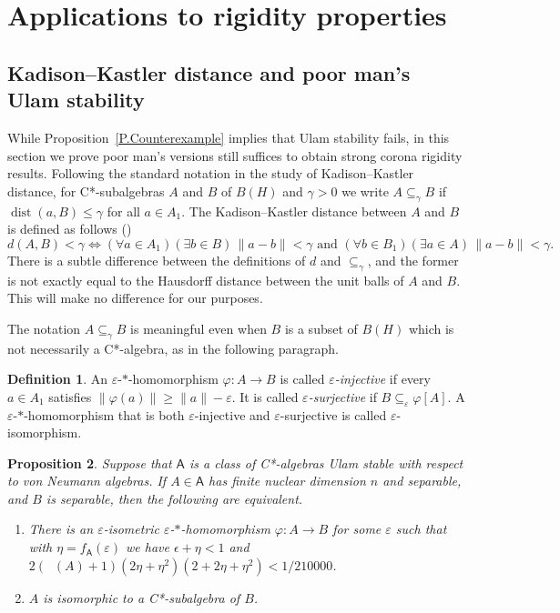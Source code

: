 \documentclass[11pt]{amsproc}
\DeclareMathOperator{\dist}{dist}
\DeclareMathOperator{\dimnuc}{dim_{nuc}}
\newcommand{\cstar}{C*}
\newcommand{\sfA}{\mathsf A}
\theoremstyle{definition}
\newtheorem{definition}{Definition}[section]
\theoremstyle{plain}
\newtheorem{proposition}[definition]{Proposition}
\theoremstyle{remark}
\begin{document}
\section{Applications to rigidity properties}

\subsection{Kadison--Kastler distance and poor man's Ulam stability}\label{S.KadisonKastler}


While Proposition~\ref{P.Counterexample} implies that Ulam stability fails, in this section we prove poor man's versions  still suffices to obtain strong corona rigidity results. Following the standard notation in the study of Kadison--Kastler distance, for \cstar-subalgebras $A$ and $B$ of $B(H)$ and $\gamma>0$ we write $A\subseteq_\gamma B$ if $\dist(a,B)\leq \gamma$ for all $a\in A_1$. 
The Kadison--Kastler distance between $A$ and $B$ is defined as follows (\cite[\S 2]{CSSWW:Perturbations})
\[
d(A,B)<\gamma\Leftrightarrow
(\forall a\in A_1)(\exists b\in B) \, \|a-b\|<\gamma\text{ and }
(\forall b\in B_1)(\exists a\in A) \, \|a-b\|<\gamma. 
\]
There is a subtle difference between the definitions of $d$ and $\subseteq_\gamma$, and the former is not exactly equal to the Hausdorff distance between the unit balls of $A$ and $B$. This will make no difference for our purposes. 

The notation $A\subseteq_\gamma B$ is meaningful even when $B$ is a subset of $B(H)$ which is not necessarily a \cstar-algebra, as in the following paragraph. 

\begin{definition}
	An $\varepsilon$-$*$-homomorphism $\varphi\colon A\to B$ is called \emph{$\varepsilon$-injective} if every $a\in A_1$ satisfies $\|\varphi(a)\|\geq \|a\|-\varepsilon$. 
	It is called \emph{$\varepsilon$-surjective} if $B\subseteq _\varepsilon\varphi[A]$. A $\varepsilon$-$*$-homomorphism that is both $\varepsilon$-injective and $\varepsilon$-surjective is called $\varepsilon$-isomorphism. 
\end{definition}



\begin{proposition}\label{P.AlmostInclusion}
	Suppose that $\sfA$ is a class of \cstar-algebras Ulam stable with respect to von Neumann algebras. If $A\in \sfA$ has finite nuclear dimension $n$ and separable, and $B$ is separable, then the following are equivalent. 
	\begin{enumerate}
		\item There is an $\varepsilon$-isometric $\varepsilon$-$*$-homomorphism $\varphi\colon A\to B$ for some $\varepsilon$ such that  with $\eta=f_\sfA(\varepsilon)$  we have $\epsilon+\eta<1$ and 
		$2(\dimnuc(A)+1)(2\eta+\eta^2)(2+2\eta+\eta^2)<1/210000$. 
		\item $A$ is isomorphic to a \cstar-subalgebra of $B$. 
	\end{enumerate}
\end{proposition}
\end{document}
